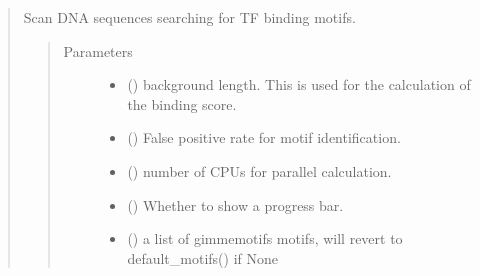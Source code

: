\documentclass[letterpaper,10pt,english]{sphinxmanual}
\begin{document}
\begin{quote}
\begin{fulllineitems}
\begin{fulllineitems}
\begin{quote}
\begin{description}
\end{description}\end{quote}

\end{fulllineitems}


\begin{fulllineitems}
\label{\detokenize{modules/celloracle.motif_analysis:celloracle.motif_analysis.TFinfo.scan}}
Scan DNA sequences searching for TF binding motifs.
\begin{quote}\begin{description}
\item[{Parameters}] \leavevmode\begin{itemize}
\item {} 
 () \textendash{} background length. This is used for the calculation of the binding score.

\item {} 
 () \textendash{} False positive rate for motif identification.

\item {} 
 () \textendash{} number of CPUs for parallel calculation.

\item {} 
 () \textendash{} Whether to show a progress bar.

\item {} 
 () \textendash{} a list of gimmemotifs motifs, will revert to default\_motifs() if None


\end{itemize}
\end{description}
\end{quote}
\end{fulllineitems}
\end{fulllineitems}
\end{quote}
\end{document}
